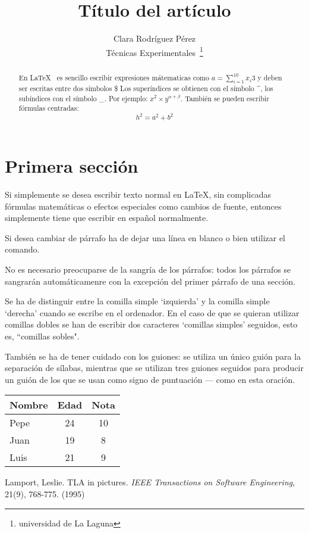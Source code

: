 \documentclass[a4paper,12pt]{article}
\begin{document}
\title{Título del artículo}
\author{Clara Rodr\'iguez P\'erez \\
          Técnicas Experimentales~\footnote{universidad de La Laguna}
          }
\date{\Today}
\maketitle
\begin{abstract}
  En \LaTeX{}~\cite{Lam:86} es sencillo escribir expresiones
  mátematicas como $a=\sum_{i=1}^{10} {x_i}{3}$
  y deben ser escritas entre dos símbolos \$
  Los superíndices se obtienen con el símbolo \^{},
  los subíndices con el símbolo \_.
  Por ejemplo: $x^2\times y ^{\alpha + \beta}$.
  También se pueden escribir f\'ormulas centradas:
  \[h^2=a^2  + b^2\]
\end{abstract}

\section{Primera sección}

Si simplemente se desea escribir texto normal en LaTeX, 
sin complicadas f\'ormulas matem\'aticas o efectos especiales
como cambios de fuente, entonces simplemente tiene que escribir
en espa\~nol normalmente.\par
Si desea cambiar de párrafo ha de dejar una línea en blanco o bien
utilizar el comando. \par
No es necesario preocuparse de la sangría de los párrafos:
todos los párrafos se sangrarán automáticamenre con la excepción
del primer párrafo de una sección.

Se ha de distinguir entre la comilla simple `izquierda'
y la comilla simple `derecha' cuando se escribe en el ordenador.
En el caso de que se quieran utilizar comillas dobles se han de
escribir dos caracteres `comillas simples' seguidos, esto es,
``comillas sobles".

También se ha de tener cuidado con los guiones: se utiliza un único
guión para la separación de sílabas, mientras que se utilizan 
tres guiones seguidos para producir un guión de los que se usan 
como signo de puntuación --- como en esta oración.

\bigskip
\begin{tabular}{|l|c|c|}
\hline
   Nombre & Edad & Nota \\ \hline
   Pepe   & 24   &  10  \\ \hline
   Juan   & 19   &   8   \\ \hline
   Luis   & 21   &   9   \\ \hline
\end{tabular}

\begin{thebibliography}{00}
    Lamport, Leslie.
    TLA in pictures.
    \emph{IEEE Transactions on Software Engineering},
    21(9), 768-775.
    (1995)
\end{thebibliography}
\end{document}

